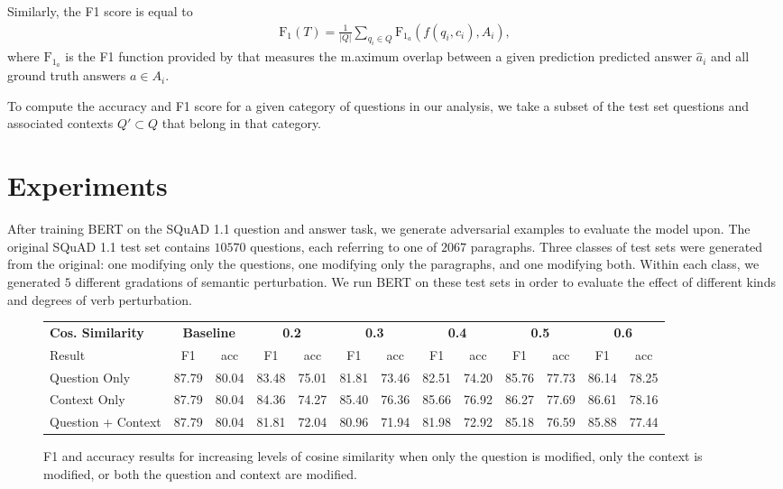\documentclass[11pt,a4paper]{article}
\begin{document}
Similarly, the F1 score is equal to
\begin{align*}
    \text{F}_1(T) = \frac{1}{|Q|} \sum_{q_i \in Q} \text{F}_{1_a}(f(q_i, c_i), A_i),
\end{align*}
where $\text{F}_{1_a}$ is the F1 function provided by \citet{rajpurkar2016squad} that measures the m.aximum overlap between a given prediction predicted answer $\hat{a}_i$ and all ground truth answers $a \in A_i$.

To compute the accuracy and F1 score for a given category of questions in our analysis, we take a subset of the test set questions and associated contexts $Q' \subset Q$ that belong in that category.

\section{Experiments}

After training BERT on the SQuAD 1.1 question and answer task, we generate adversarial examples to evaluate the model upon. The original SQuAD 1.1 test set contains $10570$ questions, each referring to one of $2067$ paragraphs. Three classes of test sets were generated from the original: one modifying only the questions, one modifying only the paragraphs, and one modifying both. Within each class, we generated $5$ different gradations of semantic perturbation. We run BERT on these test sets in order to evaluate the effect of different kinds and degrees of verb perturbation. 

\begin{figure*}[h]
\centering
\begin{tabular}{ |m{1.75cm}|c|c|c|c|c|c|c|c|c|c|c|c| }
  \hline
  \textbf{Cos. Similarity} & \multicolumn{2}{|c|}{\textbf{Baseline}} &
  \multicolumn{2}{|c|}{\textbf{0.2}} &
  \multicolumn{2}{|c|}{\textbf{0.3}} &
  \multicolumn{2}{|c|}{\textbf{0.4}} &
  \multicolumn{2}{|c|}{\textbf{0.5}} &
  \multicolumn{2}{|c|}{\textbf{0.6}}\\
  \cline{1-13}
  Result & F1 & acc & F1 & acc & F1 & acc & F1 & acc & F1 & acc & F1 & acc \\
  \hline
  Question Only & 87.79 & 80.04 & 83.48 & 75.01 & 81.81 & 73.46 & 82.51 & 74.20 & 85.76 & 77.73 & 86.14 & 78.25\\
  \hline
  Context Only & 87.79 & 80.04 & 84.36 & 74.27 & 85.40 & 76.36 & 85.66 & 76.92 & 86.27 & 77.69 & 86.61 & 78.16\\ 
  \hline
  Question + Context & 87.79 & 80.04 & 81.81 & 72.04 & 80.96 & 71.94 & 81.98 & 72.92 & 85.18 & 76.59 & 85.88 & 77.44\\
  \hline
\end{tabular}
\caption{F1 and accuracy results for increasing levels of cosine similarity when only the question is modified, only the context is modified, or both the question and context are modified.}
\label{tab:my_label}
\end{figure*}
\end{document}
